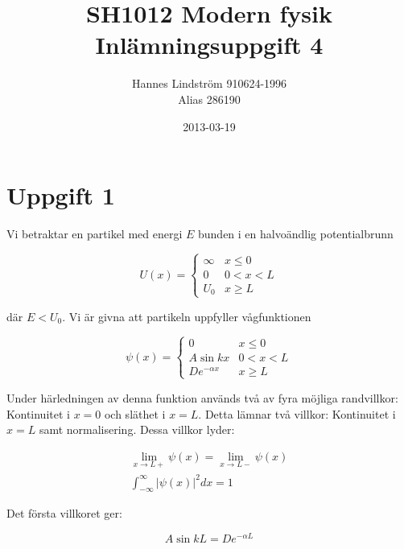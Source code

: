 \documentclass[12pt,a4paper]{article}
\begin{document}
\title{SH1012 Modern fysik \\
Inlämningsuppgift 4}
\author{Hannes Lindström 910624-1996 \\
Alias 286190}
\date{2013-03-19}
\maketitle
\thispagestyle{empty}

\clearpage
\thispagestyle{empty}
\hfill
\clearpage

\newpage
\setcounter{page}{1}

\section*{Uppgift 1}

Vi betraktar en partikel med energi $E$ bunden i en halvoändlig potentialbrunn

\begin{equation*}
U(x)=
\begin{cases}
\infty & x\le0 \\
0 & 0<x<L \\
U_0 & x\ge L
\end{cases}
\end{equation*}

där $E<U_0$. Vi är givna att partikeln uppfyller vågfunktionen

\begin{equation*}
\psi(x)=
\begin{cases}
0 & x\le0 \\
A\sin kx & 0<x<L \\
De^{-\alpha x} & x\ge L
\end{cases}
\end{equation*}

Under härledningen av denna funktion används två av fyra möjliga randvillkor: Kontinuitet i $x=0$ och släthet i $x=L$. Detta lämnar två villkor: Kontinuitet i $x=L$ samt normalisering. Dessa villkor lyder:

\begin{gather*}
\lim_{x\rightarrow L+}\psi(x)=\lim_{x\rightarrow L-}\psi(x) \\
\int_{-\infty}^{\infty}|\psi(x)|^2dx=1
\end{gather*}

Det första villkoret ger:

\begin{equation*}
A\sin kL=De^{-\alpha L}
\end{equation*}
\end{document}
